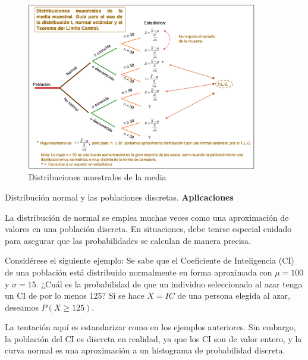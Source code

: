 \documentclass[
  10pt,
  ignorenonframetext,
]{beamer}
\begin{document}
\begin{frame}{}
\protect\hypertarget{section-33}{}
\begin{figure}
\centering
\includegraphics[width=0.9\textwidth,height=\textheight]{figuras/dist-muest-media.png}
\caption{Distribuciones muestrales de la media}
\end{figure}
\end{frame}

\begin{frame}{Distribución normal y las poblaciones discretas.}
\protect\hypertarget{distribuciuxf3n-normal-y-las-poblaciones-discretas.}{}
\textbf{Aplicaciones}

La distribución de normal se emplea muchas veces como una aproximación
de valores en una población discreta. En situaciones, debe tenrse
especial cuidado para asegurar que las probabilidades se calculan de
manera precisa.

Considérese el siguiente ejemplo: Se sabe que el Coeficiente de
Inteligencia (CI) de una población está distribuido normalmente en forma
aproximada con \(\mu =100\) y \(\sigma = 15\). ¿Cuál es la probabilidad
de que un individuo seleccionado al azar tenga un CI de por lo menos
125? Si se hace \(X = IC\) de una persona elegida al azar, deseamos
\(P(X \ge 125)\).

La tentación aquí es estandarizar como en los ejemplos anteriores. Sin
embargo, la población del CI es discreta en realidad, ya que los CI son
de valor entero, y la curva normal es una aproximación a un histograma
de probabilidad discreta.
\end{frame}
\end{document}
